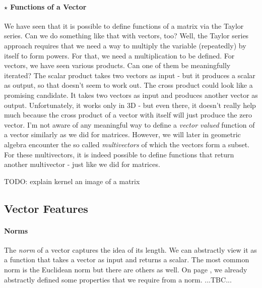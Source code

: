 
\paragraph{$\star$ Functions of a Vector}
We have seen that it is possible to define functions of a matrix via the Taylor series. Can we do something like that with vectors, too? Well, the Taylor series approach requires that we need a way to multiply the variable (repeatedly) by itself to form powers. For that, we need a multiplication to be defined. For vectors, we have seen various products. Can one of them be meaningfully iterated? The scalar product takes two vectors as input - but it produces a scalar as output, so that doesn't seem to work out. The cross product could look like a promising candidate. It takes two vectors as input and produces another vector as output. Unfortunately, it works only in 3D - but even there, it doesn't really help much because the cross product of a vector with itself will just produce the zero vector. I'm not aware of any meaningful way to define a \emph{vector valued} function of a vector similarly as we did for matrices. However, we will later in geometric algebra encounter the so called \emph{multivectors} of which the vectors form a subset. For these multivectors, it is indeed possible to define functions that return another multivector - just like we did for matrices.

\medskip
TODO: explain kernel an image of a matrix







\subsection{Vector Features}

\paragraph{Norms}
The \emph{norm} of a vector captures the idea of its length. We can abstractly view it as a function that takes a vector as input and returns a scalar. The most common norm is the Euclidean norm but there are others as well. On page \pageref{Tab:Norm}, we already abstractly defined some properties that we require from a norm. ...TBC...

